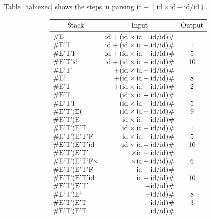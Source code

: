 \documentclass[11pt]{article}
\newcommand{\id}{\mathrm{id}}
\newcommand{\E}{\textnormal{E}}
\newcommand{\Ep}{\textnormal{E'}}
\newcommand{\T}{\textnormal{T}}
\newcommand{\Tp}{\textnormal{T'}}
\newcommand{\F}{\textnormal{F}}
\begin{document}
\subsection{}
Table~\ref{tab:exec} shows the steps in parsing \(\id + (\id \times \id - \id / \id)\).
\begin{table}[H]
	\[
	\begin{array}{lrc}
		\toprule
		 \multicolumn{1}{c}{\textnormal{Stack}} & \multicolumn{1}{c}{\textnormal{Input}} & \textnormal{Output} \\
		\midrule
		\# \E & \id + (\id \times \id - \id / \id) \# & \\
		\# \Ep \T & \id + (\id \times \id - \id / \id) \# & 1 \\
		\# \Ep \Tp \F & \id + (\id \times \id - \id / \id) \# & 5 \\
		\# \Ep \Tp \id & \id + (\id \times \id - \id / \id) \# & 10 \\
		\# \Ep \Tp & + (\id \times \id - \id / \id) \# & \\
		\# \Ep & + (\id \times \id - \id / \id) \# & 8 \\
		\# \Ep \T + & + (\id \times \id - \id / \id) \# & 2 \\
		\# \Ep \T & (\id \times \id - \id / \id) \# & \\
		\# \Ep \Tp \F & (\id \times \id - \id / \id) \# & 5 \\
		\# \Ep \Tp )\E( & (\id \times \id - \id / \id) \# & 9 \\
		\# \Ep \Tp )\E & \id \times \id - \id / \id) \# & \\
		\# \Ep \Tp )\Ep \T & \id \times \id - \id / \id) \# & 1 \\
		\# \Ep \Tp )\Ep \Tp \F & \id \times \id - \id / \id) \# & 5 \\
		\# \Ep \Tp )\Ep \Tp \id & \id \times \id - \id / \id) \# & 10 \\ 
		\# \Ep \Tp )\Ep \Tp & \times \id - \id / \id) \# & \\
		\# \Ep \Tp )\Ep \Tp \F \times & \times \id - \id / \id) \# & 6 \\
		\# \Ep \Tp )\Ep \Tp \F & \id - \id / \id) \# & \\
		\# \Ep \Tp )\Ep \Tp \id & \id - \id / \id) \# & 10 \\
		\# \Ep \Tp )\Ep \Tp & - \id / \id) \# & \\
		\# \Ep \Tp )\Ep & - \id / \id) \# & 8 \\
		\# \Ep \Tp )\Ep \T - & - \id / \id) \# & 3 \\
		\# \Ep \Tp )\Ep \T & \id / \id) \# & \\

\end{array}\]
\end{table}
\end{document}

